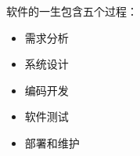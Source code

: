 \begin{frame}
  \begin{columns}
    \begin{column}{.5\textwidth}
      软件的一生包含五个过程：
      \begin{itemize}
        \item 需求分析
        \item 系统设计
        \item 编码开发
        \item 软件测试
        \item 部署和维护
      \end{itemize}
    \end{column}
    \begin{column}{.5\textwidth}
    \end{column}
  \end{columns}
\end{frame}


